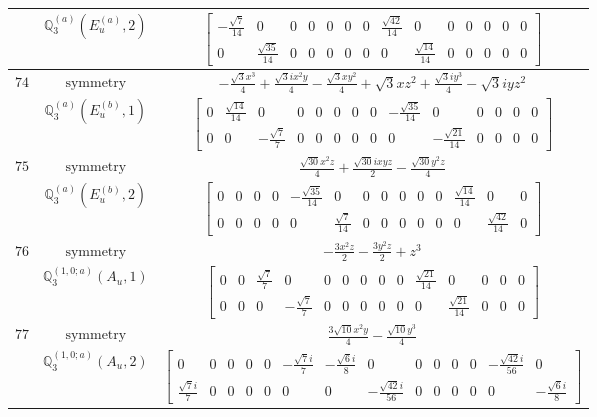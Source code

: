 \documentclass[fleqn,8pt,landscape]{jsarticle}
\begin{document}
\begin{longtable}{ccc}
$  $ & $ \mathbb{Q}_{3}^{(a)}(E_{u}^{(a)},2) $ & $ \begin{bmatrix} - \frac{\sqrt{7}}{14} & 0 & 0 & 0 & 0 & 0 & 0 & \frac{\sqrt{42}}{14} & 0 & 0 & 0 & 0 & 0 & 0 \\ 0 & \frac{\sqrt{35}}{14} & 0 & 0 & 0 & 0 & 0 & 0 & \frac{\sqrt{14}}{14} & 0 & 0 & 0 & 0 & 0 \end{bmatrix} $ \\ \hline
$ 74 $ & $ \text{symmetry} $ & $ - \frac{\sqrt{3} x^{3}}{4} + \frac{\sqrt{3} i x^{2} y}{4} - \frac{\sqrt{3} x y^{2}}{4} + \sqrt{3} x z^{2} + \frac{\sqrt{3} i y^{3}}{4} - \sqrt{3} i y z^{2} $ \\
$  $ & $ \mathbb{Q}_{3}^{(a)}(E_{u}^{(b)},1) $ & $ \begin{bmatrix} 0 & \frac{\sqrt{14}}{14} & 0 & 0 & 0 & 0 & 0 & 0 & - \frac{\sqrt{35}}{14} & 0 & 0 & 0 & 0 & 0 \\ 0 & 0 & - \frac{\sqrt{7}}{7} & 0 & 0 & 0 & 0 & 0 & 0 & - \frac{\sqrt{21}}{14} & 0 & 0 & 0 & 0 \end{bmatrix} $ \\ \hline
$ 75 $ & $ \text{symmetry} $ & $ \frac{\sqrt{30} x^{2} z}{4} + \frac{\sqrt{30} i x y z}{2} - \frac{\sqrt{30} y^{2} z}{4} $ \\
$  $ & $ \mathbb{Q}_{3}^{(a)}(E_{u}^{(b)},2) $ & $ \begin{bmatrix} 0 & 0 & 0 & 0 & - \frac{\sqrt{35}}{14} & 0 & 0 & 0 & 0 & 0 & 0 & \frac{\sqrt{14}}{14} & 0 & 0 \\ 0 & 0 & 0 & 0 & 0 & \frac{\sqrt{7}}{14} & 0 & 0 & 0 & 0 & 0 & 0 & \frac{\sqrt{42}}{14} & 0 \end{bmatrix} $ \\ \hline
$ 76 $ & $ \text{symmetry} $ & $ - \frac{3 x^{2} z}{2} - \frac{3 y^{2} z}{2} + z^{3} $ \\
$  $ & $ \mathbb{Q}_{3}^{(1,0;a)}(A_{u},1) $ & $ \begin{bmatrix} 0 & 0 & \frac{\sqrt{7}}{7} & 0 & 0 & 0 & 0 & 0 & 0 & \frac{\sqrt{21}}{14} & 0 & 0 & 0 & 0 \\ 0 & 0 & 0 & - \frac{\sqrt{7}}{7} & 0 & 0 & 0 & 0 & 0 & 0 & \frac{\sqrt{21}}{14} & 0 & 0 & 0 \end{bmatrix} $ \\ \hline
$ 77 $ & $ \text{symmetry} $ & $ \frac{3 \sqrt{10} x^{2} y}{4} - \frac{\sqrt{10} y^{3}}{4} $ \\
$  $ & $ \mathbb{Q}_{3}^{(1,0;a)}(A_{u},2) $ & $ \begin{bmatrix} 0 & 0 & 0 & 0 & 0 & - \frac{\sqrt{7} i}{7} & - \frac{\sqrt{6} i}{8} & 0 & 0 & 0 & 0 & 0 & - \frac{\sqrt{42} i}{56} & 0 \\ \frac{\sqrt{7} i}{7} & 0 & 0 & 0 & 0 & 0 & 0 & - \frac{\sqrt{42} i}{56} & 0 & 0 & 0 & 0 & 0 & - \frac{\sqrt{6} i}{8} \end{bmatrix} $ \\ \hline

\end{longtable}
\end{document}
